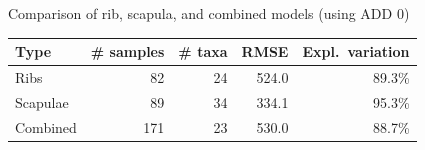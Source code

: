 \documentclass{beamer}
\begin{document}
\begin{frame}{Comparison of rib, scapula, and combined models (using ADD 0)}

  \begin{tabular}{lrrrr}
    Type & \# samples & \# taxa & RMSE & Expl.\ variation\\ \hline
    Ribs & 82 & 24 & 524.0 & 89.3\% \\
    Scapulae & 89 & 34 & 334.1 & 95.3\% \\
    Combined & 171 & 23 & 530.0 & 88.7\%
  \end{tabular}
  
  \vspace{0.2in}



\end{frame}
\end{document}
